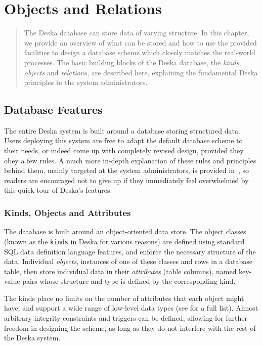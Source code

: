 \documentclass[deska]{subfiles}
\begin{document}
\chapter{Objects and Relations}

\begin{abstract}
The Deska database can store data of varying structure.  In this chapter, we provide an overview of what can be stored
and how to use the provided facilities to design a database scheme which closely matches the real-world processes.  The
basic building blocks of the Deska database, the {\em kinds}, {\em objects} and {\em relations}, are described here,
explaining the fundamental Deska principles to the system administrators.
\end{abstract}

\section{Database Features}

The entire Deska system is built around a database storing structured data.  Users deploying this system are free to
adapt the default database scheme to their needs, or indeed come up with completely revised design, provided they obey a
few rules.  A much more in-depth explanation of these rules and principles behind them, mainly targeted at the system
administrators, is provided in~, so readers are encouraged not to give up if they
immediately feel overwhelmed by this quick tour of Deska's features.

\subsection{Kinds, Objects and Attributes}

The database is built around an object-oriented data store.  The object classes (known as the {\tt kinds} in Deska for
various reasons) are defined using standard SQL data definition language features, and enforce the necessary structure
of the data.  Individual {\em objects}, instances of one of these classes and rows in a database table, then store
individual data in their {\em attributes} (table columns), named key-value pairs whose structure and type is defined by
the corresponding kind.

The kinds place no limits on the number of attributes that each object might have, and support a wide range of low-level
data types (see  for a full list).  Almost arbitrary integrity constraints and
triggers can be defined, allowing for further freedom in designing the scheme, as long as they do not interfere with the
rest of the Deska system.
\end{document}
